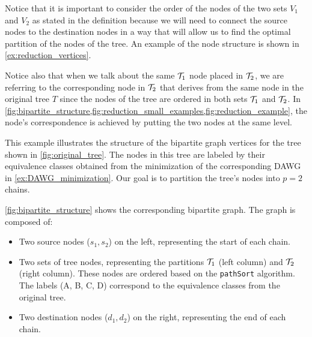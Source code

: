 Notice that it is important to consider the order of the nodes of the two sets $V_1$ and $V_2$ as stated in the definition because we will need to connect the source nodes to the destination nodes in a way that will allow us to find the optimal partition of the nodes of the tree. An example of the node structure is shown in \cref{ex:reduction_vertices}.

Notice also that when we talk about the same $\treeset{1}$ node placed in $\treeset{2}$, we are referring to the corresponding node in $\treeset{2}$ that derives from the same node in the original tree $T$ since the nodes of the tree are ordered in both sets $\treeset{1}$ and $\treeset{2}$. In \cref{fig:bipartite_structure,fig:reduction_small_examples,fig:reduction_example}, the node's correspondence is achieved by putting the two nodes at the same level.
\begin{example}[Vertices] \label{ex:reduction_vertices}
    This example illustrates the structure of the bipartite graph vertices for the tree shown in \cref{fig:original_tree}. The nodes in this tree are labeled by their equivalence classes obtained from the minimization of the corresponding DAWG in \cref{ex:DAWG_minimization}. Our goal is to partition the tree's nodes into $p=2$ chains.

    \cref{fig:bipartite_structure} shows the corresponding bipartite graph. The graph is composed of:
    \begin{itemize}
        \item Two source nodes ($s_1, s_2$) on the left, representing the start of each chain.
        \item Two sets of tree nodes, representing the partitions $\treeset{1}$ (left column) and $\treeset{2}$ (right column). These nodes are ordered based on the \texttt{pathSort} algorithm. The labels (A, B, C, D) correspond to the equivalence classes from the original tree.
        \item Two destination nodes ($d_1, d_2$) on the right, representing the end of each chain.
    \end{itemize}

    \begin{figure}[H]
        \centering
        \begin{tikzpicture}[
            level distance=1.5cm,
            sibling distance=3cm,
            state/.style={circle, draw, minimum size=7mm},
            accepting/.style={circle, draw, double, minimum size=7mm},
            edge from parent/.style={draw, -latex},
            level 1/.style={sibling distance=4cm},
            level 2/.style={sibling distance=2.5cm},
            level 3/.style={sibling distance=2cm}
            ]
        

\end{tikzpicture}
\end{figure}
\end{example}
